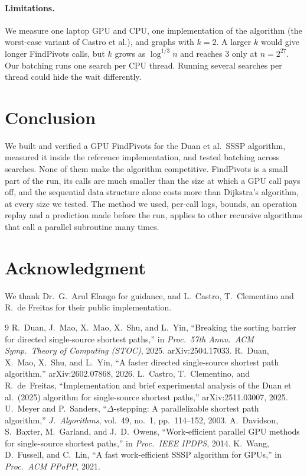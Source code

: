 \documentclass[conference]{IEEEtran}
\begin{document}
\paragraph{Limitations.} We measure one laptop GPU and CPU, one implementation of the algorithm (the worst-case variant
of Castro et al.), and graphs with $k = 2$. A larger $k$ would give longer FindPivots calls, but $k$ grows as
$\log^{1/3} n$ and reaches 3 only at $n = 2^{27}$. Our batching runs one search per CPU thread. Running several searches
per thread could hide the wait differently.

\section{Conclusion}

We built and verified a GPU FindPivots for the Duan et al.\ SSSP algorithm, measured it inside the reference
implementation, and tested batching across searches. None of them make the algorithm competitive. FindPivots is a
small part of the run, its calls are much smaller than the size at which a GPU call pays off, and the sequential data
structure alone costs more than Dijkstra's algorithm, at every size we tested. The method we used, per-call logs, bounds, an operation replay and a
prediction made before the run, applies to other recursive algorithms that call a parallel subroutine many times.

\section*{Acknowledgment}
We thank Dr.\ G.\ Arul Elango for guidance, and L.\ Castro, T.\ Clementino and R.\ de Freitas for their public
implementation.

\begin{thebibliography}{9}
 R.~Duan, J.~Mao, X.~Mao, X.~Shu, and L.~Yin, ``Breaking the sorting barrier for directed
single-source shortest paths,'' in \emph{Proc.\ 57th Annu.\ ACM Symp.\ Theory of Computing (STOC)}, 2025.
arXiv:2504.17033.
 R.~Duan, X.~Mao, X.~Shu, and L.~Yin, ``A faster directed single-source shortest path algorithm,''
arXiv:2602.07868, 2026.
 L.~Castro, T.~Clementino, and R.~de~Freitas, ``Implementation and brief experimental analysis of
the Duan et al.\ (2025) algorithm for single-source shortest paths,'' arXiv:2511.03007, 2025.
 U.~Meyer and P.~Sanders, ``$\Delta$-stepping: A parallelizable shortest path algorithm,''
\emph{J.\ Algorithms}, vol.~49, no.~1, pp.~114--152, 2003.
 A.~Davidson, S.~Baxter, M.~Garland, and J.~D.~Owens, ``Work-efficient parallel GPU methods for
single-source shortest paths,'' in \emph{Proc.\ IEEE IPDPS}, 2014.
 K.~Wang, D.~Fussell, and C.~Lin, ``A fast work-efficient SSSP algorithm for GPUs,'' in
\emph{Proc.\ ACM PPoPP}, 2021.
\end{thebibliography}
\end{document}
